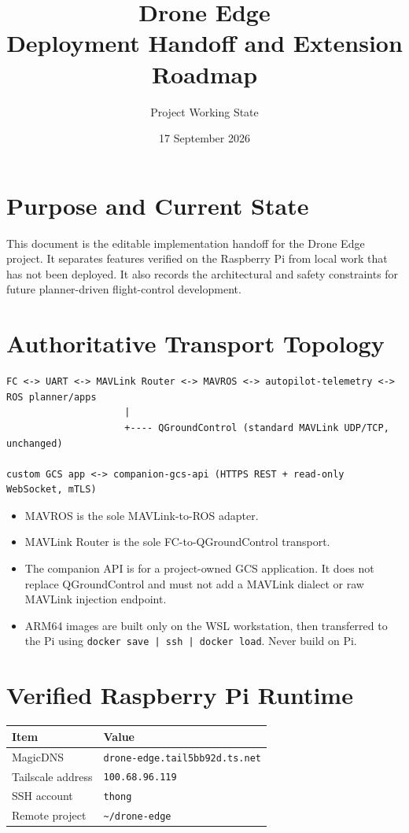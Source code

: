 \documentclass[11pt,a4paper]{article}
\title{Drone Edge\\Deployment Handoff and Extension Roadmap}
\author{Project Working State}
\date{17 September 2026}
\newcommand{\pathtext}[1]{\texttt{#1}}
\begin{document}
\maketitle
\tableofcontents
\newpage

\section{Purpose and Current State}

This document is the editable implementation handoff for the Drone Edge project.
It separates features verified on the Raspberry Pi from local work that has not
been deployed. It also records the architectural and safety constraints for
future planner-driven flight-control development.

\section{Authoritative Transport Topology}

\begin{lstlisting}
FC <-> UART <-> MAVLink Router <-> MAVROS <-> autopilot-telemetry <-> ROS planner/apps
                     |
                     +---- QGroundControl (standard MAVLink UDP/TCP, unchanged)

custom GCS app <-> companion-gcs-api (HTTPS REST + read-only WebSocket, mTLS)
\end{lstlisting}

\begin{itemize}
  \item MAVROS is the sole MAVLink-to-ROS adapter.
  \item MAVLink Router is the sole FC-to-QGroundControl transport.
  \item The companion API is for a project-owned GCS application. It does not
        replace QGroundControl and must not add a MAVLink dialect or raw MAVLink
        injection endpoint.
  \item ARM64 images are built only on the WSL workstation, then transferred to
        the Pi using \pathtext{docker save | ssh | docker load}. Never build on Pi.
\end{itemize}

\section{Verified Raspberry Pi Runtime}

\begin{tabular}{ll}
\toprule
Item & Value \\
\midrule
MagicDNS & \pathtext{drone-edge.tail5bb92d.ts.net} \\
Tailscale address & \pathtext{100.68.96.119} \\
SSH account & \pathtext{thong} \\
Remote project & \pathtext{\textasciitilde/drone-edge} \\
\bottomrule
\end{tabular}
\end{document}
